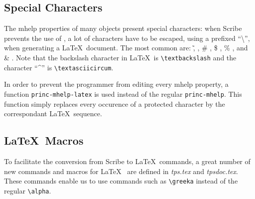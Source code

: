 \subsection{Special Characters}

The mhelp properties of many \TPS objects present special characters: when Scribe prevents the use
of \@ , a lot of characters have to be escaped, using a prefixed ``\textbackslash '', when generating a \LaTeX ~document. The most common are: \~ , \@ , \# , \$ , \% , and \& . Note that the backslash character in \LaTeX ~is
\verb+\textbackslash+ and the character ``\textasciicircum '' is \verb+\textasciicircum+.

In order to prevent the programmer from editing every mhelp property, a function {\tt princ-mhelp-latex} is used
instead of the regular {\tt princ-mhelp}. This function simply replaces every occurence of a protected character
by the correspondant \LaTeX ~sequence.

\subsection{\LaTeX ~Macros}

To facilitate the conversion from Scribe to \LaTeX ~commands, a great number of new commands and macros for \LaTeX
~are defined in {\it tps.tex} and {\it tpsdoc.tex}. These commands enable us to use commands such as \verb+\greeka+ instead of the regular \verb+\alpha+.